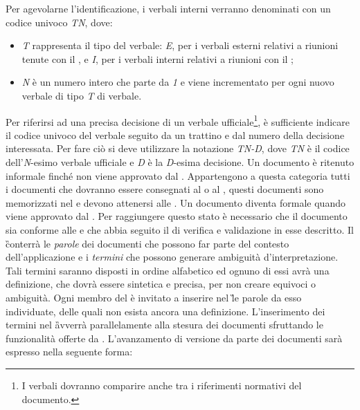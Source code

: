 Per agevolarne l'identificazione, i verbali interni verranno denominati con un codice univoco \emph{TN}, dove:
\begin{itemize}
\item \emph{T} rappresenta il tipo del verbale: \emph{E}, per i verbali esterni relativi a riunioni tenute con il , e \emph{I}, per i verbali interni relativi a riunioni con il ;
\item \emph{N} è un numero intero che parte da \emph{1} e viene incrementato per ogni nuovo verbale di tipo \emph{T} di verbale.
\end{itemize}
Per riferirsi ad una precisa decisione di un verbale ufficiale\footnote{I verbali dovranno comparire anche tra i riferimenti normativi del documento.}, è sufficiente indicare il codice univoco del verbale seguito da un trattino e dal numero della decisione interessata. Per fare ciò si deve utilizzare la notazione \emph{TN-D}, dove \emph{TN} è il codice dell’\emph{N}-esimo verbale ufficiale e \emph{D} è la \emph{D}-esima decisione.
Un documento è ritenuto informale finché non viene approvato dal \rRP.
Appartengono a questa categoria tutti i documenti che dovranno essere consegnati al  o al ,
questi documenti sono memorizzati nel  \texttt{\pragmaDocs} e devono attenersi alle \NP.
Un documento diventa formale quando viene approvato dal \rRP.
Per raggiungere questo stato è necessario che il documento sia conforme alle \NP e che abbia seguito il  di verifica e validazione in esse descritto.
\subsubsubsubsubsection{\G}
Il \G conterrà le \emph{parole} dei documenti che possono far parte del contesto dell'applicazione e i \emph{termini} che possono generare ambiguità d'interpretazione. Tali termini saranno disposti in ordine alfabetico ed ognuno di essi avrà una definizione, che dovrà essere sintetica e precisa, per non creare equivoci o ambiguità.
Ogni membro del  è invitato a inserire nel \G le parole da esso individuate, delle quali non esista ancora una definizione. L'inserimento dei termini nel \G avverrà parallelamente alla stesura dei documenti sfruttando le funzionalità offerte da \pragmadb.
\label{versionamento}
L'avanzamento di versione da parte dei documenti sarà espresso nella seguente forma:
